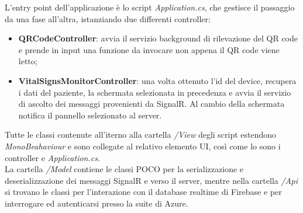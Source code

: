 L'entry point dell'applicazione è lo script \textit{Application.cs}, che gestisce il passaggio da una fase all'altra, istanziando due differenti controller:
\begin{itemize}
    \item \textbf{QRCodeController}: avvia il servizio background di rilevazione del QR code e prende in input una funzione da invocare non appena il QR code viene letto;
    
    \item \textbf{VitalSignsMonitorController}: una volta ottenuto l'id del device, recupera i dati del paziente\footnotemark{}, la schermata selezionata in precedenza e avvia il servizio di ascolto dei messaggi provenienti da SignalR. Al cambio della schermata notifica il pannello selezionato al server\footnotemark[\value{footnote}].
\end{itemize}

Tutte le classi contenute all'iterno alla cartella \textit{/View} degli script estendono \textit{MonoBeahaviour} e sono collegate al relativo elemento UI, così come lo sono i controller e \textit{Application.cs}.\\

La cartella \textit{/Model} contiene le classi POCO per la serializzazione e deserializzazione dei messaggi SignalR e verso il server, mentre nella cartella \textit{/Api} si trovano le classi per l'interazione con il database realtime di Firebase e per interrogare ed autenticarsi presso la suite di Azure.


